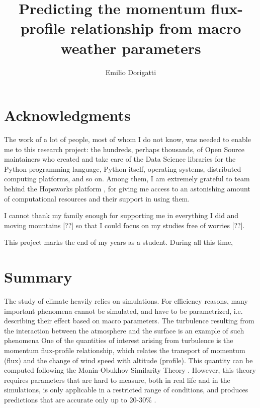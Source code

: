 \documentclass[a4paper]{book}
\begin{document}
\title{Predicting the momentum flux-profile relationship from  macro weather parameters}
\author{Emilio Dorigatti}


\maketitle
\restoregeometry


\section*{Acknowledgments}
The work of a lot of people, most of whom I do not know, was needed to enable me to this research project: the hundreds, perhaps thousands, of Open Source maintainers who created and take care of the Data Science libraries for the Python programming language, 
Python itself, operating systems, distributed computing platforms, and so on. Among them, I am extremely grateful to team behind the Hopsworks platform \citep{hops}, for giving me access to an astonishing amount of computational resources and their support in using them.

I cannot thank my family enough for supporting me in everything I did and moving mountains [??] so that I could focus on my studies free of worries [??].

This project marks the end of my years as a student.  During all this time,

\newpage

\section*{Summary}
The study of climate heavily relies on simulations. For efficiency reasons, many important phenomena cannot be simulated, and have to be parametrized, i.e. describing their effect based on macro parameters. The turbulence resulting from the interaction between the atmosphere and the surface is an example of such phenomena One of the quantities of interest arising from turbulence is the momentum flux-profile relationship, which relates the transport of momentum (flux) and the change of wind speed with altitude (profile). This quantity can be computed following the Monin-Obukhov Similarity Theory \citep{mostayyyy}. However, this theory requires parameters that are hard to measure, both in real life and in the simulations, is only applicable in a restricted range of conditions, and produces predictions that are accurate only up to 20-30\% \citep{50years}.
\end{document}
